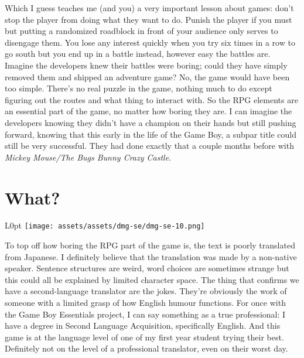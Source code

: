 \documentclass{book}
\let\oldcenter\center
\let\oldendcenter\endcenter
\renewenvironment{center}{\setlength\topsep{0pt}\oldcenter}{\oldendcenter}
\begin{document}
\begin{center}
\quad\vspace{4pt}
\quad\vspace{4pt}
\end{center}

Which I guess teaches me (and you) a very important lesson about games: don’t stop the player from doing what they want to do. Punish the player if you must but putting a randomized roadblock in front of your audience only serves to disengage them. You lose any interest quickly when you try six times in a row to go south but you end up in a battle instead, however easy the battles are. Imagine the developers knew their battles were boring; could they have simply removed them and shipped an adventure game? No, the game would have been too simple. There’s no real puzzle in the game, nothing much to do except figuring out the routes and what thing to interact with. So the RPG elements are an essential part of the game, no matter how boring they are. I can imagine the developers knowing they didn’t have a champion on their hands but still pushing forward, knowing that this early in the life of the Game Boy, a subpar title could still be very successful. They had done exactly that a couple months before with \emph{Mickey Mouse/The Bugs Bunny Crazy Castle}.

\FloatBarrier\needspace{10mm}\section*{What?}\nopagebreak[4]

\begin{wrapfigure}{L}{0pt} \texttt{[image: assets/assets/dmg-se/dmg-se-10.png]}\end{wrapfigure}
To top off how boring the RPG part of the game is, the text is poorly translated from Japanese. I definitely believe that the translation was made by a non-native speaker. Sentence structures are weird, word choices are sometimes strange but this could all be explained by limited character space. The thing that confirms we have a second-language translator are the jokes. They’re obviously the work of someone with a limited grasp of how English humour functions. For once with the Game Boy Essentials project, I can say something as a true professional: I have a degree in Second Language Acquisition, specifically English. And this game is at the language level of one of my first year student trying their best. Definitely not on the level of a professional translator, even on their worst day.
\end{document}
